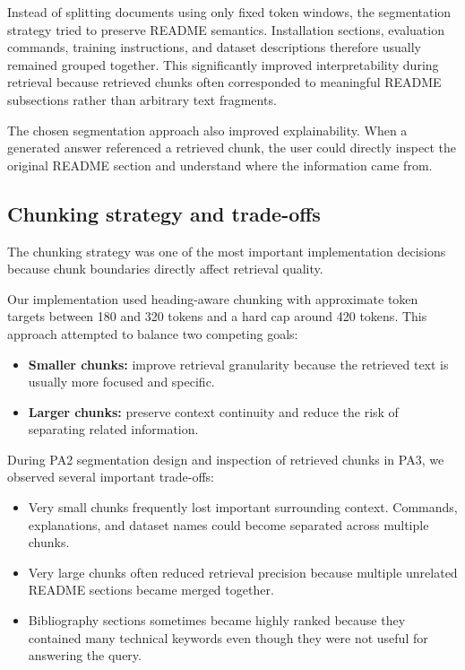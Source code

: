 \documentclass[11pt,a4paper]{article}
\begin{document}
Instead of splitting documents using only fixed token windows, the segmentation strategy tried to preserve README semantics. Installation sections, evaluation commands, training instructions, and dataset descriptions therefore usually remained grouped together. This significantly improved interpretability during retrieval because retrieved chunks often corresponded to meaningful README subsections rather than arbitrary text fragments.

The chosen segmentation approach also improved explainability. When a generated answer referenced a retrieved chunk, the user could directly inspect the original README section and understand where the information came from.

\subsection{Chunking strategy and trade-offs}
The chunking strategy was one of the most important implementation decisions because chunk boundaries directly affect retrieval quality.

Our implementation used heading-aware chunking with approximate token targets between 180 and 320 tokens and a hard cap around 420 tokens. This approach attempted to balance two competing goals:

\begin{itemize}
  \item \textbf{Smaller chunks:} improve retrieval granularity because the retrieved text is usually more focused and specific.
  \item \textbf{Larger chunks:} preserve context continuity and reduce the risk of separating related information.
\end{itemize}

During PA2 segmentation design and inspection of retrieved chunks in PA3, we observed several important trade-offs:

\begin{itemize}
  \item Very small chunks frequently lost important surrounding context. Commands, explanations, and dataset names could become separated across multiple chunks.

  \item Very large chunks often reduced retrieval precision because multiple unrelated README sections became merged together.

  \item Bibliography sections sometimes became highly ranked because they contained many technical keywords even though they were not useful for answering the query.
\end{itemize}
\end{document}
